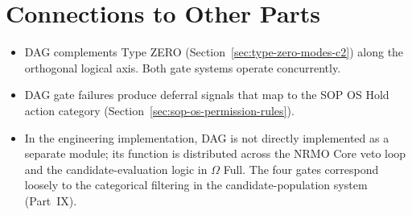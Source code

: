 \section*{Connections to Other Parts}

\begin{itemize}
\item DAG complements Type ZERO
(Section~\ref{sec:type-zero-modes-c2}) along the orthogonal logical
axis. Both gate systems operate concurrently.
\item DAG gate failures produce deferral signals that map to the
SOP OS Hold action category
(Section~\ref{sec:sop-os-permission-rules}).
\item In the engineering implementation, DAG is not directly
implemented as a separate module; its function is distributed
across the NRMO Core veto loop and the candidate-evaluation logic
in $\Omega$ Full. The four gates correspond loosely to the
categorical filtering in the candidate-population system
(Part~IX).
\end{itemize}
